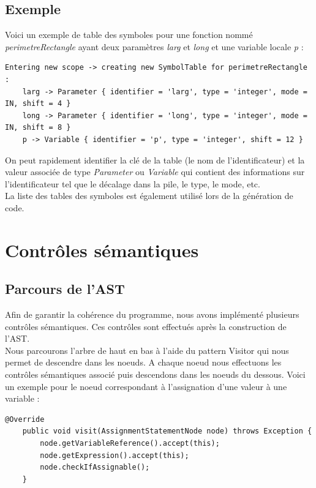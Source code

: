 \documentclass[french,a4paper]{article}
\begin{document}
    \subsection{Exemple}
    Voici un exemple de table des symboles  pour une fonction nommé \textit{perimetreRectangle} ayant deux paramètres \textit{larg} et \textit{long} et une variable locale \textit{p} :
    \begin{lstlisting}[label={lst:lstlisting16}]
Entering new scope -> creating new SymbolTable for perimetreRectangle  :
    larg -> Parameter { identifier = 'larg', type = 'integer', mode = IN, shift = 4 }
    long -> Parameter { identifier = 'long', type = 'integer', mode = IN, shift = 8 }
    p -> Variable { identifier = 'p', type = 'integer', shift = 12 }
    \end{lstlisting}

    On peut rapidement identifier la clé de la table (le nom de l'identificateur) et la valeur associée de type \textit{Parameter} ou \textit{Variable} qui contient des informations sur l'identificateur tel que le décalage dans la pile, le type, le mode, etc. \\

    La liste des tables des symboles est également utilisé lors de la génération de code.

    \section{Contrôles sémantiques}

    \subsection{Parcours de l'AST}

    Afin de garantir la cohérence du programme, nous avons implémenté plusieurs contrôles sémantiques. Ces contrôles sont effectués après la construction de l'AST.\\

    Nous parcourons l'arbre de haut en bas à l'aide du pattern Visitor qui nous permet de descendre dans les noeuds. A chaque noeud nous effectuons les contrôles sémantiques associé puis descendons dans les noeuds du dessous. Voici un exemple pour le noeud correspondant à l'assignation d'une valeur à une variable : \\

    \begin{lstlisting}[label={lst:lstlisting17}]
    @Override
    public void visit(AssignmentStatementNode node) throws Exception {
        node.getVariableReference().accept(this);
        node.getExpression().accept(this);
        node.checkIfAssignable();
    }
    \end{lstlisting}
\end{document}
